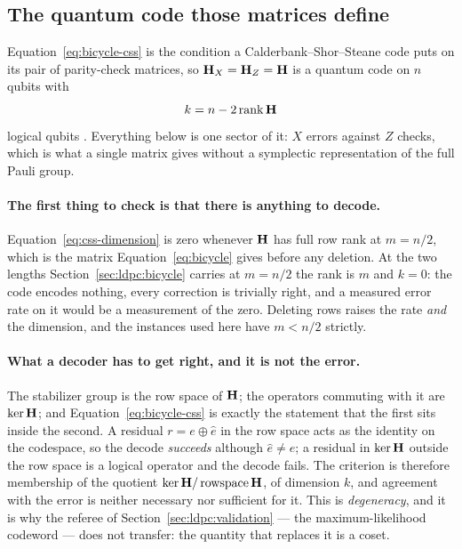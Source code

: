 \documentclass[11pt,a4paper]{article}
\begin{document}
\subsection{The quantum code those matrices define}
\label{sec:ldpc:css}
Equation~\ref{eq:bicycle-css} is the condition a Calderbank--Shor--Steane code
puts on its pair of parity-check matrices, so $\mathbf{H}_X = \mathbf{H}_Z = \mathbf{H}$
is a quantum code on $n$ qubits with
\begin{equation}
  k = n - 2 \operatorname{rank} \mathbf{H}
  \label{eq:css-dimension}
\end{equation}
logical qubits \citep{mackay2004}. Everything below is one sector of it: $X$
errors against $Z$ checks, which is what a single matrix gives without a
symplectic representation of the full Pauli group.

\paragraph{The first thing to check is that there is anything to decode.}
Equation~\ref{eq:css-dimension} is zero whenever $\mathbf{H}$ has full row rank
at $m = n/2$, which is the matrix Equation~\ref{eq:bicycle} gives before any
deletion. At the two lengths Section~\ref{sec:ldpc:bicycle} carries at
$m = n/2$ the rank is $m$ and $k = 0$: the code encodes nothing, every
correction is trivially right, and a measured error rate on it would be a
measurement of the zero. Deleting rows raises the rate \emph{and} the
dimension, and the instances used here have $m < n/2$ strictly.

\paragraph{What a decoder has to get right, and it is not the error.}
The stabilizer group is the row space of $\mathbf{H}$; the operators commuting
with it are $\ker \mathbf{H}$; and Equation~\ref{eq:bicycle-css} is exactly the
statement that the first sits inside the second. A residual
$r = e \oplus \hat e$ in the row space acts as the identity on the codespace,
so the decode \emph{succeeds} although $\hat e \neq e$; a residual in
$\ker \mathbf{H}$ outside the row space is a logical operator and the decode
fails. The criterion is therefore membership of the quotient
$\ker \mathbf{H} / \operatorname{rowspace} \mathbf{H}$, of dimension $k$, and
agreement with the error is neither necessary nor sufficient for it. This is
\emph{degeneracy}, and it is why the referee of
Section~\ref{sec:ldpc:validation} --- the maximum-likelihood codeword --- does
not transfer: the quantity that replaces it is a coset.
\end{document}

